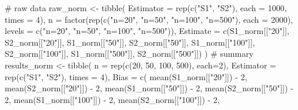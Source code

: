 \documentclass[
]{article}
\newenvironment{Shaded}{\begin{snugshade}}{\end{snugshade}}
\newcommand{\AttributeTok}[1]{\textcolor[rgb]{0.40,0.45,0.13}{#1}}
\newcommand{\CommentTok}[1]{\textcolor[rgb]{0.37,0.37,0.37}{#1}}
\newcommand{\DecValTok}[1]{\textcolor[rgb]{0.68,0.00,0.00}{#1}}
\newcommand{\FunctionTok}[1]{\textcolor[rgb]{0.28,0.35,0.67}{#1}}
\newcommand{\NormalTok}[1]{\textcolor[rgb]{0.00,0.23,0.31}{#1}}
\newcommand{\OtherTok}[1]{\textcolor[rgb]{0.00,0.23,0.31}{#1}}
\newcommand{\SpecialCharTok}[1]{\textcolor[rgb]{0.37,0.37,0.37}{#1}}
\newcommand{\StringTok}[1]{\textcolor[rgb]{0.13,0.47,0.30}{#1}}
\begin{document}
\begin{Shaded}
\begin{Highlighting}[numbers=left,,]
\CommentTok{\# raw data }
\NormalTok{raw\_norm }\OtherTok{\textless{}{-}} \FunctionTok{tibble}\NormalTok{(}
  \AttributeTok{Estimator =} \FunctionTok{rep}\NormalTok{(}\FunctionTok{c}\NormalTok{(}\StringTok{"S1"}\NormalTok{, }\StringTok{"S2"}\NormalTok{), }\AttributeTok{each =} \DecValTok{1000}\NormalTok{, }\AttributeTok{times =} \DecValTok{4}\NormalTok{),}
  \AttributeTok{n =} \FunctionTok{factor}\NormalTok{(}\FunctionTok{rep}\NormalTok{(}\FunctionTok{c}\NormalTok{(}\StringTok{"n=20"}\NormalTok{, }\StringTok{"n=50"}\NormalTok{, }\StringTok{"n=100"}\NormalTok{, }\StringTok{"n=500"}\NormalTok{), }\AttributeTok{each =} \DecValTok{2000}\NormalTok{),}
            \AttributeTok{levels =} \FunctionTok{c}\NormalTok{(}\StringTok{"n=20"}\NormalTok{, }\StringTok{"n=50"}\NormalTok{, }\StringTok{"n=100"}\NormalTok{, }\StringTok{"n=500"}\NormalTok{)),}
  \AttributeTok{Estimate =} \FunctionTok{c}\NormalTok{(S1\_norm[[}\StringTok{"20"}\NormalTok{]], S2\_norm[[}\StringTok{"20"}\NormalTok{]],}
\NormalTok{              S1\_norm[[}\StringTok{"50"}\NormalTok{]], S2\_norm[[}\StringTok{"50"}\NormalTok{]],}
\NormalTok{              S1\_norm[[}\StringTok{"100"}\NormalTok{]], S2\_norm[[}\StringTok{"100"}\NormalTok{]],}
\NormalTok{              S1\_norm[[}\StringTok{"500"}\NormalTok{]], S2\_norm[[}\StringTok{"500"}\NormalTok{]])}
\NormalTok{)}
\CommentTok{\# summary }
\NormalTok{results\_norm }\OtherTok{\textless{}{-}} \FunctionTok{tibble}\NormalTok{(}
  \AttributeTok{n =} \FunctionTok{rep}\NormalTok{(}\FunctionTok{c}\NormalTok{(}\DecValTok{20}\NormalTok{, }\DecValTok{50}\NormalTok{, }\DecValTok{100}\NormalTok{, }\DecValTok{500}\NormalTok{), }\AttributeTok{each=}\DecValTok{2}\NormalTok{),}
  \AttributeTok{Estimator =} \FunctionTok{rep}\NormalTok{(}\FunctionTok{c}\NormalTok{(}\StringTok{"S1"}\NormalTok{, }\StringTok{"S2"}\NormalTok{), }\AttributeTok{times =} \DecValTok{4}\NormalTok{),}
  \AttributeTok{Bias =} \FunctionTok{c}\NormalTok{(}
    \FunctionTok{mean}\NormalTok{(S1\_norm[[}\StringTok{"20"}\NormalTok{]]) }\SpecialCharTok{{-}} \DecValTok{2}\NormalTok{, }\FunctionTok{mean}\NormalTok{(S2\_norm[[}\StringTok{"20"}\NormalTok{]]) }\SpecialCharTok{{-}} \DecValTok{2}\NormalTok{,}
    \FunctionTok{mean}\NormalTok{(S1\_norm[[}\StringTok{"50"}\NormalTok{]]) }\SpecialCharTok{{-}} \DecValTok{2}\NormalTok{, }\FunctionTok{mean}\NormalTok{(S2\_norm[[}\StringTok{"50"}\NormalTok{]]) }\SpecialCharTok{{-}} \DecValTok{2}\NormalTok{,}
    \FunctionTok{mean}\NormalTok{(S1\_norm[[}\StringTok{"100"}\NormalTok{]]) }\SpecialCharTok{{-}} \DecValTok{2}\NormalTok{, }\FunctionTok{mean}\NormalTok{(S2\_norm[[}\StringTok{"100"}\NormalTok{]]) }\SpecialCharTok{{-}} \DecValTok{2}\NormalTok{,}

\end{Highlighting}
\end{Shaded}
\end{document}

